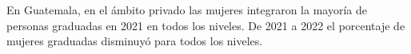 En Guatemala, en el ámbito privado las mujeres integraron la mayoría de personas graduadas en 2021 en todos los niveles. De 2021 a 2022 el porcentaje de mujeres graduadas disminuyó para todos los niveles. 